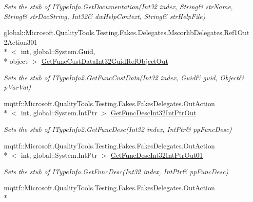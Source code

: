 \begin{DoxyCompactItemize}
\begin{DoxyCompactList}\small\item\em Sets the stub of I\-Type\-Info.\-Get\-Documentation(Int32 index, String\& str\-Name, String\& str\-Doc\-String, Int32\& dw\-Help\-Context, String\& str\-Help\-File)\end{DoxyCompactList}\item 
global\-::\-Microsoft.\-Quality\-Tools.\-Testing.\-Fakes.\-Delegates.\-Mscorlib\-Delegates.\-Ref1\-Out2\-Action301\\*
$<$ int, global\-::\-System.\-Guid, \\*
object $>$ \hyperlink{class_system_1_1_runtime_1_1_interop_services_1_1_com_types_1_1_fakes_1_1_stub_i_type_info2_a5c957e58d3435b75fa4d37704fa1e930}{Get\-Func\-Cust\-Data\-Int32\-Guid\-Ref\-Object\-Out}
\begin{DoxyCompactList}\small\item\em Sets the stub of I\-Type\-Info2.\-Get\-Func\-Cust\-Data(Int32 index, Guid\& guid, Object\& p\-Var\-Val)\end{DoxyCompactList}\item 
mqttf\-::\-Microsoft.\-Quality\-Tools.\-Testing.\-Fakes.\-Fakes\-Delegates.\-Out\-Action\\*
$<$ int, global\-::\-System.\-Int\-Ptr $>$ \hyperlink{class_system_1_1_runtime_1_1_interop_services_1_1_com_types_1_1_fakes_1_1_stub_i_type_info2_a8da8459b7105ab69735bf74880b030b8}{Get\-Func\-Desc\-Int32\-Int\-Ptr\-Out}
\begin{DoxyCompactList}\small\item\em Sets the stub of I\-Type\-Info2.\-Get\-Func\-Desc(Int32 index, Int\-Ptr\& pp\-Func\-Desc)\end{DoxyCompactList}\item 
mqttf\-::\-Microsoft.\-Quality\-Tools.\-Testing.\-Fakes.\-Fakes\-Delegates.\-Out\-Action\\*
$<$ int, global\-::\-System.\-Int\-Ptr $>$ \hyperlink{class_system_1_1_runtime_1_1_interop_services_1_1_com_types_1_1_fakes_1_1_stub_i_type_info2_a038a9742a3c1958522aaf14e30da86a6}{Get\-Func\-Desc\-Int32\-Int\-Ptr\-Out01}
\begin{DoxyCompactList}\small\item\em Sets the stub of I\-Type\-Info.\-Get\-Func\-Desc(Int32 index, Int\-Ptr\& pp\-Func\-Desc)\end{DoxyCompactList}\item 
mqttf\-::\-Microsoft.\-Quality\-Tools.\-Testing.\-Fakes.\-Fakes\-Delegates.\-Out\-Action\\*

\end{DoxyCompactItemize}
